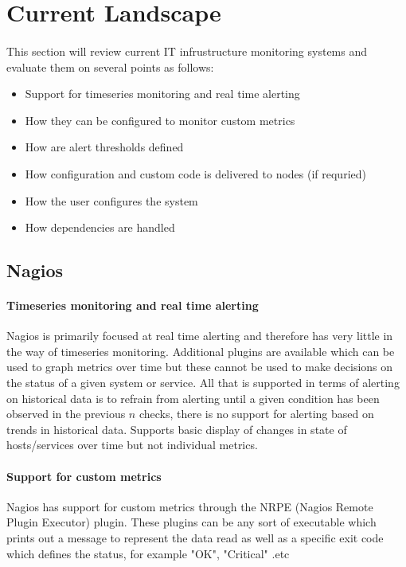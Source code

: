 \documentclass[bsc,logo,twoside]{infthesis}
\begin{document}
\section{Current Landscape}
\paragraph*{}
This section will review current IT infrustructure monitoring systems and evaluate them on
several points as follows:
\begin{itemize}
	\item Support for timeseries monitoring and real time alerting
	\item How they can be configured to monitor custom metrics
	\item How are alert thresholds defined
	\item How configuration and custom code is delivered to nodes (if requried)
	\item How the user configures the system
	\item How dependencies are handled
\end{itemize}

\subsection{Nagios}
\paragraph*{Timeseries monitoring and real time alerting}
Nagios is primarily focused at real time alerting and therefore has very little in the way of 
timeseries monitoring.  Additional plugins are available which can be used to graph metrics
over time but these cannot be used to make decisions on the status of a given system or service.
All that is supported in terms of alerting on historical data is to refrain from alerting until
a given condition has been observed in the previous $n$ checks, there is no support for alerting
based on trends in historical data.  Supports basic display of changes in state of hosts/services
over time but not individual metrics.

\paragraph*{Support for custom metrics}
Nagios has support for custom metrics through the NRPE (Nagios Remote Plugin Executor) plugin.
These plugins can be any sort of executable which prints out a message to represent the data read
as well as a specific exit code which defines the status, for example "OK", "Critical"
.etc
\end{document}
